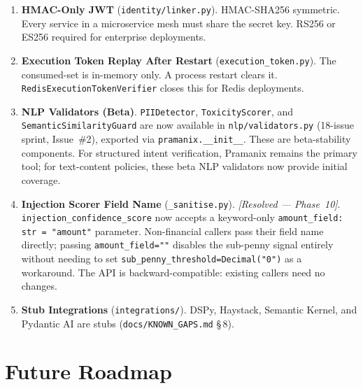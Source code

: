 \documentclass[12pt,a4paper,oneside]{report}
\newcommand{\fname}[1]{\texttt{#1}}          %
\newcommand{\code}[1]{\texttt{#1}}           %
\newcommand{\cfrsec}[1]{\S\,#1}             %
\begin{document}
\begin{enumerate}
  \item \textbf{HMAC-Only JWT} (\fname{identity/linker.py}). HMAC-SHA256
        symmetric. Every service in a microservice mesh must share the secret
        key. RS256 or ES256 required for enterprise deployments.

  \item \textbf{Execution Token Replay After Restart}
        (\fname{execution\_token.py}). The consumed-set is in-memory only. A
        process restart clears it. \code{RedisExecutionTokenVerifier} closes
        this for Redis deployments.

  \item \textbf{NLP Validators (Beta)}. \code{PIIDetector},
        \code{ToxicityScorer}, and \code{SemanticSimilarityGuard} are now
        available in \fname{nlp/validators.py} (18-issue sprint, Issue~\#2),
        exported via \code{pramanix.\_\_init\_\_}.  These are
        beta-stability components.  For structured intent verification,
        Pramanix remains the primary tool; for text-content policies, these
        beta NLP validators now provide initial coverage.

  \item \textbf{Injection Scorer Field Name}
        (\fname{\_sanitise.py}). \textit{[Resolved — Phase~10]}.
        \code{injection\_confidence\_score} now accepts a keyword-only
        \code{amount\_field: str = "amount"} parameter.  Non-financial
        callers pass their field name directly; passing
        \code{amount\_field=""} disables the sub-penny signal entirely
        without needing to set \code{sub\_penny\_threshold=Decimal("0")}
        as a workaround.  The API is backward-compatible: existing callers
        need no changes.

  \item \textbf{Stub Integrations} (\fname{integrations/}). DSPy, Haystack,
        Semantic Kernel, and Pydantic AI are stubs
        (\fname{docs/KNOWN\_GAPS.md} \cfrsec{8}).
\end{enumerate}

\section{Future Roadmap}
\end{document}
